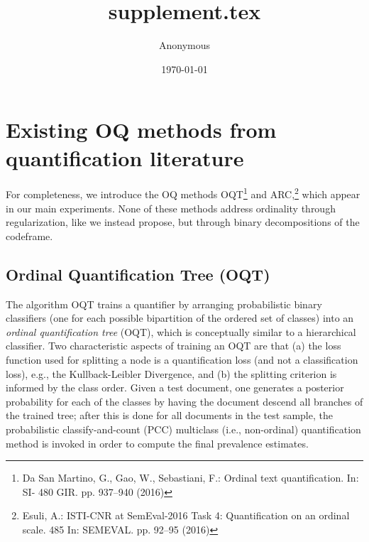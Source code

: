 \documentclass[10pt,a4paper]{article}
\title{supplement.tex}
\author{Anonymous}
\date{\today}
\begin{document}
\section{Existing OQ methods from quantification literature}
\label{sec:existingmethods}

\noindent For completeness, we introduce the OQ methods OQT\footnote{Da San Martino, G., Gao, W., Sebastiani, F.: Ordinal text quantification. In: SI- 480 GIR. pp. 937–940 (2016)}
and ARC,\footnote{Esuli, A.: ISTI-CNR at SemEval-2016 Task 4: Quantification on an ordinal scale. 485 In: SEMEVAL. pp. 92–95 (2016)}
which appear
in our main experiments.
None of these
methods address ordinality through regularization, like we instead propose, but through binary decompositions of the codeframe.



\subsection{Ordinal Quantification Tree (OQT)}
\label{sec:OQT}

\noindent The algorithm OQT
trains a
quantifier by arranging probabilistic binary classifiers (one for each
possible bipartition of the ordered set of classes) into an
\emph{ordinal quantification tree} (OQT), which is conceptually
similar to a hierarchical classifier. Two characteristic aspects of
training an OQT are that (a) the loss function used for splitting a
node is a quantification loss (and not a classification loss), e.g.,
the Kullback-Leibler Divergence, and (b) the splitting criterion is
informed by the class order. Given a test document, one generates a
posterior probability for each of the classes by having the document
descend all branches of the trained tree; after this is done for all
documents in the test sample, the probabilistic classify-and-count
(PCC) %
multiclass (i.e., non-ordinal)
quantification method is invoked in order to compute the final
prevalence estimates.
\end{document}
